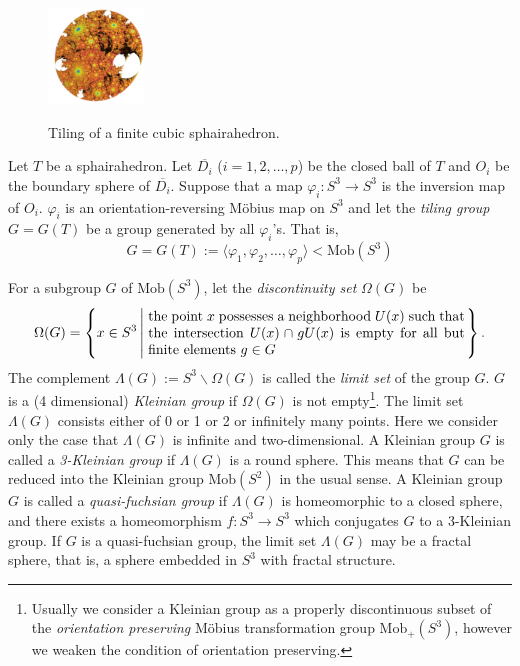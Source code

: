 \documentclass[suppldata, dvipdfmx]{interact}
\theoremstyle{plain}%
\theoremstyle{definition}
\theoremstyle{remark}
\theoremstyle{problemstyle}
\begin{document}
\begin{figure}[h!tbp]
 \hspace*{\fill}
 \begin{minipage}[t]{0.18\textwidth}
  \centering
  \includegraphics[width=1in, height=1in, keepaspectratio]{./img/constructFractal/finiteProcess/final.jpg}
  \label{fig:sphaira-final}
 \end{minipage}
 \hspace*{\fill}
 \caption{Tiling of a finite cubic sphairahedron.}
 \label{fig:sphairahedronTile}
\end{figure}

Let $T$ be a sphairahedron.  Let $\overline{D_i}$ ($i = 1,2,\ldots, p$) be the closed ball of $T$ and $O_i$ be the boundary sphere of $\overline{D_i}$.  Suppose that a map $\varphi_i:S^3 \to S^3$ is the inversion map of $O_i$.  $\varphi_i$ is an orientation-reversing M\"obius map on $S^3$ and let the {\it tiling group} $G=G(T)$ be a group generated by all $\varphi_i$'s.  That is,
\[
 G = G(T) := \langle\varphi_1, \varphi_2, \ldots , \varphi_p  \rangle < \text{Mob}(S^3)
\]

For a subgroup $G$ of
$\text{Mob}(S^3)$, let the {\it discontinuity set} $\Omega(G)$ be
\[
\Omega(G) = \left\{ x \in S^3 \left| \hspace{1mm} 
\begin{minipage}{8cm}
the point $x$ possesses a neighborhood $U(x)$
such that the intersection $U(x) \cap gU(x)$ is empty for all but finite
elements $g\in G$
\end{minipage}
 \right. \right\}.
\]
The complement $\Lambda(G) := S^3 \backslash \Omega(G)$ is called the
{\it limit set} of the group $G$. $G$ is a (4 dimensional) {\it Kleinian group} if $\Omega(G)$ is
not empty\footnote{Usually we consider a Kleinian group as a properly discontinuous subset of the {\it orientation preserving} M\"obius transformation group $\text{Mob}_+(S^3)$, however we weaken the condition of orientation preserving.}. The limit set $\Lambda(G)$ consists either of 0 or 1 or 2 or
infinitely many points. Here we consider only the case that $\Lambda(G)$
is infinite and two-dimensional. 
A Kleinian group $G$ is called a
{\it 3-Kleinian group} if $\Lambda(G)$ is a round sphere. This means that $G$ can be reduced into the Kleinian group $\text{Mob}(S^2)$ in the usual sense.  
A Kleinian group $G$ is called a
{\it quasi-fuchsian group} if $\Lambda(G)$ is homeomorphic to a closed sphere, 
and there exists a homeomorphism $f:S^3 \rightarrow S^3$ which conjugates
$G$ to a 3-Kleinian group. If $G$ is a quasi-fuchsian group, the limit set
$\Lambda(G)$ may be a fractal sphere, that is, a sphere embedded in $S^3$ with
 fractal structure.
\end{document}
